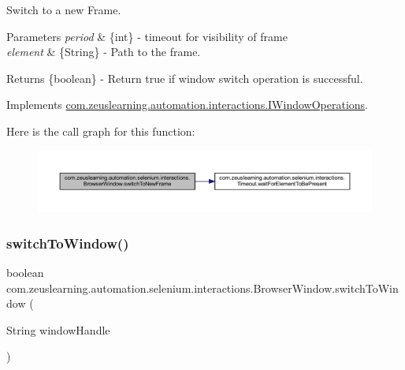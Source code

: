 Switch to a new Frame.


\begin{DoxyParams}{Parameters}
{\em period} & \{int\} -\/ timeout for visibility of frame \\
\hline
{\em element} & \{String\} -\/ Path to the frame. \\
\hline
\end{DoxyParams}
\begin{DoxyReturn}{Returns}
\{boolean\} -\/ Return {\ttfamily true} if window switch operation is successful. 
\end{DoxyReturn}


Implements \hyperlink{interfacecom_1_1zeuslearning_1_1automation_1_1interactions_1_1IWindowOperations_a24e2a4aa538e35924e7195d058f30b9b}{com.\+zeuslearning.\+automation.\+interactions.\+I\+Window\+Operations}.

Here is the call graph for this function\+:
\nopagebreak
\begin{figure}[H]
\begin{center}
\leavevmode
\includegraphics[width=350pt]{d8/d87/classcom_1_1zeuslearning_1_1automation_1_1selenium_1_1interactions_1_1BrowserWindow_ad9874267c9a73f226dc6a7863ae184a2_cgraph}
\end{center}
\end{figure}
\hypertarget{classcom_1_1zeuslearning_1_1automation_1_1selenium_1_1interactions_1_1BrowserWindow_aed6af64be64fb3d9db28ace2a33f2017}{}\label{classcom_1_1zeuslearning_1_1automation_1_1selenium_1_1interactions_1_1BrowserWindow_aed6af64be64fb3d9db28ace2a33f2017} 
\subsubsection{\texorpdfstring{switch\+To\+Window()}{switchToWindow()}}
{\footnotesize\ttfamily boolean com.\+zeuslearning.\+automation.\+selenium.\+interactions.\+Browser\+Window.\+switch\+To\+Window (\begin{DoxyParamCaption}\item[{String}]{window\+Handle }\end{DoxyParamCaption})\hspace{0.3cm}{\ttfamily [inline]}}

